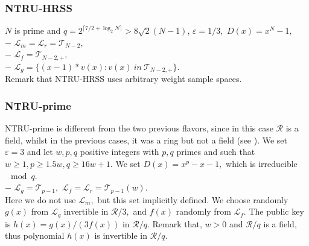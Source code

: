 \documentclass{amsart}
\numberwithin{equation}{section}
\begin{document}
{\subsubsection{NTRU-HRSS}\label{subsection:ntru-hrss} $N$ is prime and $q = 2^{\lceil 7/2+\log_2{N}\rceil} > 8\sqrt{2}(N-1)$, $\varepsilon=1/3,$ $D(x)=x^N-1,$\\
$-$ ${\mathcal{L}}_m={\mathcal{L}}_r={\mathcal{T}}_{N-2},$\\
$-$ ${\mathcal{L}}_f={\mathcal{T}}_{N-2,+},$\\
$-$ ${\mathcal{L}}_g=\{(x-1)*v(x) : v(x)\ in\ {\mathcal{T}}_{N-2,+} \}.$\\
Remark that NTRU-HRSS uses arbitrary weight sample spaces.

\subsubsection{NTRU-prime}
NTRU-prime is different from the two previous flavors, since in this case ${\mathcal{R}}$ is a field, whilst in the previous cases, it was a ring but not a field (see \cite{iot}). We set $\varepsilon=3$ and let $w,p,q$ positive integers with $p,q$ primes and such that $w\ge 1, p\ge 1.5w, q\ge 16w+1.$ We set
$D(x)=x^{p}-x-1,$ which is irreducible $\mod{ q}.$ \\
$-$ ${\mathcal{L}}_g={\mathcal{T}}_{p-1},$ ${\mathcal{L}}_f={\mathcal{L}}_r={\mathcal{T}}_{p-1}(w).$ \\
Here we do not use ${\mathcal{L}}_m,$ but this set implicitly defined. We choose randomly $g(x)$ from ${\mathcal{L}}_g$ invertible in ${\mathcal{R}}/3,$ and $f(x)$ randomly from ${\mathcal{L}}_f$.
The public key is $h(x)=g(x)/(3f(x))$ in ${\mathcal{R}}/q.$ Remark that, $w>0$ and ${\mathcal{R}}/q$ is a field, thus polynomial $h(x)$ is invertible in ${\mathcal{R}}/q.$
 
}
\end{document}
